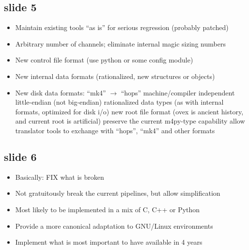\subsection{slide 5}
\begin{itemize}
\item Maintain existing tools “as is” for serious regression (probably patched)
\item Arbitrary number of channels; eliminate internal magic sizing numbers
\item New control file format (\eg use python or some config module)
\item New internal data formats (rationalized, new structures or objects)
\item New disk data formats: “mk4” $\rightarrow$ “hops”
\sbitem machine/compiler independent little-endian (not big-endian)
\sbitem rationalized data types (as with internal formats, optimized for disk i/o)
\sbitem new root file format (ovex is ancient history, and current root is artificial)
\sbitem preserve the current m4py-type capability
\sbitem allow translator tools to exchange with “hops”, “mk4” and other formats
\end{itemize}

\subsection{slide 6}
\begin{itemize}
\item Basically: FIX what is broken
\item Not gratuitously break the current pipelines, but allow simplification
\item Most likely to be implemented in a mix of \ac{C}, \ac{C++} or \ac{Python}
\item Provide a more canonical adaptation to \ac{GNU/Linux} environments
\item Implement what is most important to have available in 4 years
\end{itemize}
%
%
